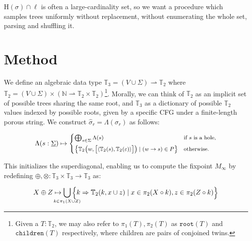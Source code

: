 \documentclass[sigplan,nonacm]{acmart}\settopmatter{printfolios=false,printccs=false,printacmref=false}
\begin{document}
  $\text{H}(\sigma)\cap\ell$ is often a large-cardinality set, so we want a procedure which samples trees uniformly without replacement, without enumerating the whole set, parsing and shuffling it.

  \pagebreak\section{Method}\label{sec:method}

   We define an algebraic data type $\mathbb{T}_3 = (V \cup \Sigma) \rightharpoonup \mathbb{T}_2$ where $\mathbb{T}_2 = (V \cup \Sigma) \times (\mathbb{N} \rightharpoonup \mathbb{T}_2\times\mathbb{T}_2)$\footnote{Given a $T:\mathbb{T}_2$, we may also refer to $\pi_1(T), \pi_2(T)$ as $\texttt{root}(T)$ and $\texttt{children}(T)$ respectively, where children are pairs of conjoined twins.}. Morally, we can think of $\mathbb{T}_2$ as an implicit set of possible trees sharing the same root, and $\mathbb{T}_3$ as a dictionary of possible $\mathbb{T}_2$ values indexed by possible roots, given by a specific CFG under a finite-length porous string. We construct $\hat\sigma_r = \Lambda(\sigma_r)$ as follows:

\vspace{-10pt}\begin{equation*}
  \begin{footnotesize}
\Lambda(s: \underline\Sigma) \mapsto \begin{cases}
\bigoplus_{s\in \Sigma} \Lambda(s) & \text{if $s$ is a hole,} \vspace{5pt}\\
\big\{\mathbb{T}_2\big(w, \big[\langle\mathbb{T}_2(s), \mathbb{T}_2(\varepsilon)\rangle\big]\big) \mid (w \rightarrow s)\in P\big\} & \text{otherwise.}
\end{cases}
  \end{footnotesize}
\end{equation*}

\noindent This initializes the superdiagonal, enabling us to compute the fixpoint $M_\infty$ by redefining $\oplus, \otimes: \mathbb{T}_3 \times \mathbb{T}_3 \rightarrow \mathbb{T}_3$ as:

\begin{equation*}
  \begin{footnotesize}
  X \oplus Z \mapsto \bigcup_{\mathclap{k\in \pi_1(X \cup Z)}}\Big\{k \Rightarrow \mathbb{T}_2(k, x \cup z) \mid x \in \pi_2(X\circ k), z \in \pi_2(Z\circ k)\Big\}
  \end{footnotesize}
\end{equation*}
\end{document}
